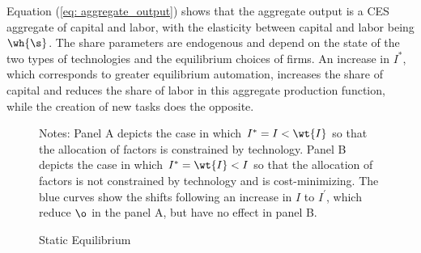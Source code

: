 \documentclass[12pt]{article}
\theoremstyle{definition}
\begin{document}
Equation (\ref{eq: aggregate_output}) shows that the aggregate output is a CES aggregate of capital and labor, with the elasticity between capital and labor being $\wh{\s}$. The share parameters are endogenous and depend on the state of the two types of technologies and the equilibrium choices of firms. An increase in $I^*$, which corresponds to greater equilibrium automation, increases the share of capital and reduces the share of labor in this aggregate production function, while the creation of new tasks does the opposite.

\begin{figure}[H]
    \noindent\caption{Static Equilibrium}
    \begin{center}
    \end{center}
    {\footnotesize Notes: Panel A depicts the case in which $I^* = I < \wt{I}$ so that the allocation of factors is constrained by technology. Panel B depicts the case in which $I^* = \wt{I} < I$ so that the allocation of factors is not constrained by technology and is cost-minimizing. The blue curves show the shifts following an increase in $I$ to $I^\prime$, which reduce $\o$ in the panel A, but have no effect in panel B.}
    \label{fig: static_equilibrium}
\end{figure}
\end{document}
